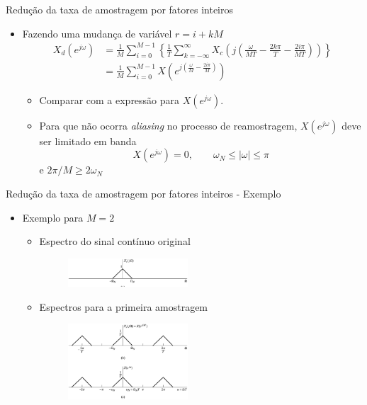 \begin{slide}{Redução da taxa de amostragem por fatores inteiros}
	\begin{itemize}
		\item Fazendo uma mudança de variável $ r = i + kM$
			\begin{align*}
				X_d(e^{j\omega})& = \frac{1}{M}\sum_{i=0}^{M-1}\left \{\frac{1}{T}\sum_{k=-\infty}^{\infty}X_c\left(j\left(\frac{\omega}{MT}-\frac{2k\pi}{T}-\frac{2i\pi}{MT}\right )\right )\right \}\\
				& = \frac{1}{M}\sum_{i=0}^{M-1}X\left (e^{j\left (\frac{\omega}{M}-\frac{2i\pi}{M}\right )}\right )
			\end{align*}
			\begin{itemize}
				\item Comparar com a expressão para $X(e^{j\omega})$.
				\item Para que não ocorra \emph{aliasing} no processo de reamostragem, $X(e^{j\omega})$ deve ser limitado em banda
					\begin{equation*}
						X(e^{j\omega})= 0, \qquad \omega_N \leq |\omega| \leq \pi
					\end{equation*}
					e  $2\pi/M \geq 2 \omega_N$
			\end{itemize}
	\end{itemize}
\end{slide}

\begin{slide}{Redução da taxa de amostragem por fatores inteiros - Exemplo}
	\begin{itemize}
		\item Exemplo para $M=2$
			\begin{itemize}
				\item Espectro do sinal contínuo original
			\begin{figure}
				\centering
				\includegraphics[width=0.45\textwidth]{figs/4-20a.eps}
		        \end{figure}
		\item Espectros para a primeira amostragem 
			\begin{figure}
				\centering
				\includegraphics[width=0.45\textwidth]{figs/4-20bc.eps}
		        \end{figure}
			\end{itemize}
	\end{itemize}
\end{slide}


